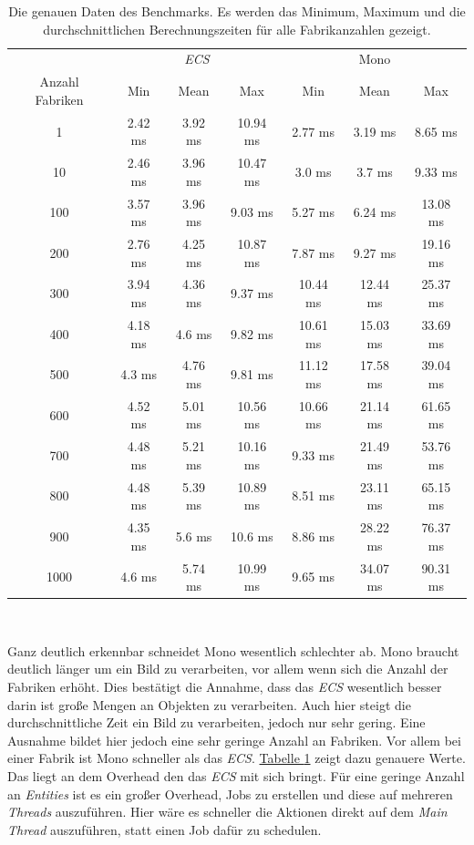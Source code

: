 \begin{table}[h]
\centering
\begin{tabular}{c|c|c|c|c|c|c}
 & \multicolumn{3}{c|}{\textit{ECS}} & \multicolumn{3}{c}{Mono}\\
Anzahl Fabriken & Min & Mean & Max & Min & Mean & Max\\
\hline
1 & 2.42 ms & 3.92 ms & 10.94 ms & 2.77 ms & 3.19 ms & 8.65 ms\\
10 & 2.46 ms & 3.96 ms & 10.47 ms & 3.0 ms & 3.7 ms & 9.33 ms\\
100 & 3.57 ms & 3.96 ms & 9.03 ms & 5.27 ms & 6.24 ms & 13.08 ms\\
200 & 2.76 ms & 4.25 ms & 10.87 ms & 7.87 ms & 9.27 ms & 19.16 ms\\
300 & 3.94 ms & 4.36 ms & 9.37 ms & 10.44 ms & 12.44 ms & 25.37 ms\\
400 & 4.18 ms & 4.6 ms & 9.82 ms & 10.61 ms & 15.03 ms & 33.69 ms\\
500 & 4.3 ms & 4.76 ms & 9.81 ms & 11.12 ms & 17.58 ms & 39.04 ms\\
600 & 4.52 ms & 5.01 ms & 10.56 ms & 10.66 ms & 21.14 ms & 61.65 ms\\
700 & 4.48 ms & 5.21 ms & 10.16 ms & 9.33 ms & 21.49 ms & 53.76 ms\\
800 & 4.48 ms & 5.39 ms & 10.89 ms & 8.51 ms & 23.11 ms & 65.15 ms\\
900 & 4.35 ms & 5.6 ms & 10.6 ms & 8.86 ms & 28.22 ms & 76.37 ms\\
1000 & 4.6 ms & 5.74 ms & 10.99 ms & 9.65 ms & 34.07 ms & 90.31 ms\\
\end{tabular}\\
\caption{Die genauen Daten des Benchmarks. Es werden das Minimum, Maximum und die durchschnittlichen Berechnungszeiten für alle Fabrikanzahlen gezeigt.}
\label{table}
\end{table}
Ganz deutlich erkennbar schneidet Mono wesentlich schlechter ab. Mono braucht deutlich länger um ein Bild zu verarbeiten, vor allem wenn sich die Anzahl der Fabriken erhöht. Dies bestätigt die Annahme, dass das \textit{ECS} wesentlich besser darin ist große Mengen an Objekten zu verarbeiten. Auch hier steigt die durchschnittliche Zeit ein Bild zu verarbeiten, jedoch nur sehr gering. Eine Ausnahme bildet hier jedoch eine sehr geringe Anzahl an Fabriken. Vor allem bei einer Fabrik ist Mono schneller als das \textit{ECS}. \hyperref[table]{Tabelle \ref*{table}} zeigt dazu genauere Werte. Das liegt an dem Overhead den das \textit{ECS} mit sich bringt. Für eine geringe Anzahl an \textit{Entities} ist es ein großer Overhead, Jobs zu erstellen und diese auf mehreren \textit{Threads} auszuführen. Hier wäre es schneller die Aktionen direkt auf dem \textit{Main Thread} auszuführen, statt einen Job dafür zu schedulen.